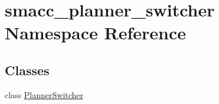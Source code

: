 \hypertarget{namespacesmacc__planner__switcher}{}\section{smacc\+\_\+planner\+\_\+switcher Namespace Reference}
\label{namespacesmacc__planner__switcher}
\subsection*{Classes}
\begin{DoxyCompactItemize}
\item 
class \hyperlink{classsmacc__planner__switcher_1_1PlannerSwitcher}{Planner\+Switcher}
\end{DoxyCompactItemize}
